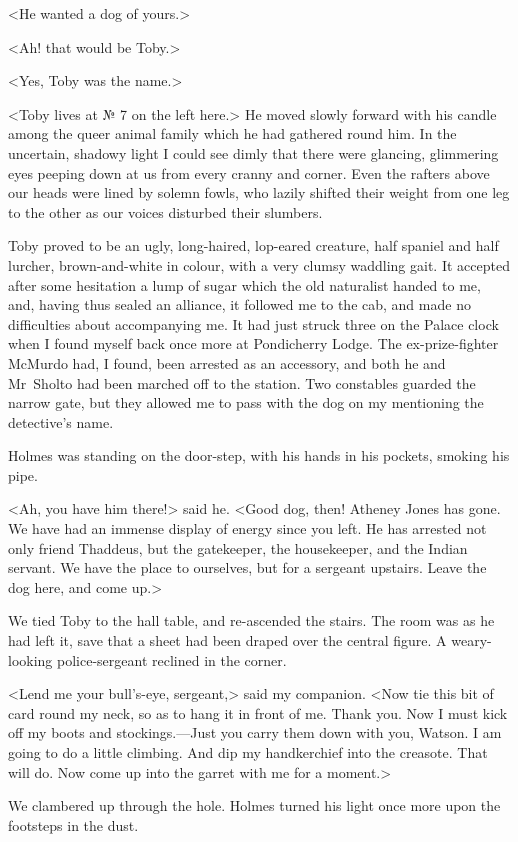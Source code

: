 <He wanted a dog of yours.>

<Ah! that would be Toby.>

<Yes, Toby was the name.>

<Toby lives at № 7 on the left here.> He moved slowly forward with his candle among the queer animal family which he had gathered round him. In the uncertain, shadowy light I could see dimly that there were glancing, glimmering eyes peeping down at us from every cranny and corner. Even the rafters above our heads were lined by solemn fowls, who lazily shifted their weight from one leg to the other as our voices disturbed their slumbers.

Toby proved to be an ugly, long-haired, lop-eared creature, half spaniel and half lurcher, brown-and-white in colour, with a very clumsy waddling gait. It accepted after some hesitation a lump of sugar which the old naturalist handed to me, and, having thus sealed an alliance, it followed me to the cab, and made no difficulties about accompanying me. It had just struck three on the Palace clock when I found myself back once more at Pondicherry Lodge. The ex-prize-fighter McMurdo had, I found, been arrested as an accessory, and both he and Mr~Sholto had been marched off to the station. Two constables guarded the narrow gate, but they allowed me to pass with the dog on my mentioning the detective's name.

Holmes was standing on the door-step, with his hands in his pockets, smoking his pipe.

<Ah, you have him there!> said he. <Good dog, then! Atheney Jones has gone. We have had an immense display of energy since you left. He has arrested not only friend Thaddeus, but the gatekeeper, the housekeeper, and the Indian servant. We have the place to ourselves, but for a sergeant upstairs. Leave the dog here, and come up.>

We tied Toby to the hall table, and re-ascended the stairs. The room was as he had left it, save that a sheet had been draped over the central figure. A weary-looking police-sergeant reclined in the corner.

<Lend me your bull's-eye, sergeant,> said my companion. <Now tie this bit of card round my neck, so as to hang it in front of me. Thank you. Now I must kick off my boots and stockings.—Just you carry them down with you, Watson. I am going to do a little climbing. And dip my handkerchief into the creasote. That will do. Now come up into the garret with me for a moment.>

We clambered up through the hole. Holmes turned his light once more upon the footsteps in the dust.

